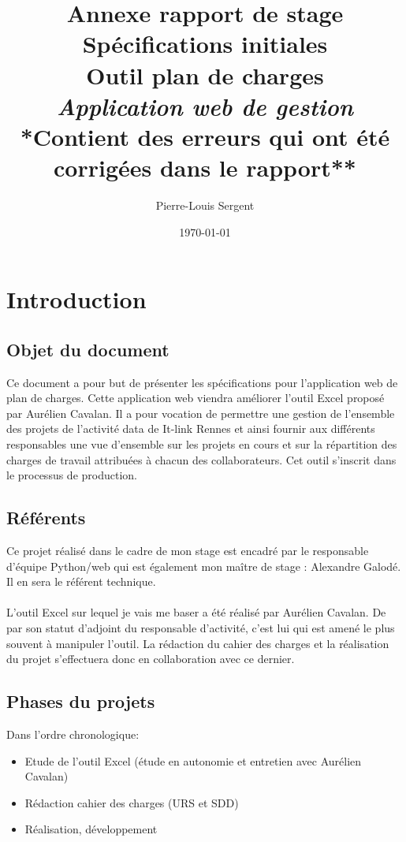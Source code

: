 \documentclass[french]{report}
\title{{\huge \textbf{Annexe rapport de stage}}\\
{\color{blue} \textbf{Spécifications initiales}}\\
Outil plan de charges\\
{\Large \textit{Application web de gestion}}\\
{\normalsize **Contient des erreurs qui ont été corrigées dans le rapport**}}
\date{\today}
\author{Pierre-Louis Sergent}
\begin{document}
    \maketitle

    \tableofcontents

\chapter{Introduction}
  \section{Objet du document}

Ce document a pour but de présenter les spécifications pour l’application web
de plan de charges. Cette application web viendra améliorer l’outil Excel
proposé par Aurélien Cavalan. Il a pour vocation de permettre une gestion de
l'ensemble des projets de l’activité data de It-link Rennes et ainsi fournir
aux différents responsables une vue d’ensemble sur les projets en cours et sur
la répartition des charges de travail attribuées à chacun des collaborateurs.
Cet outil s’inscrit dans le processus de production.

  \section{Référents}

Ce projet réalisé dans le cadre de mon stage est encadré par le responsable
d’équipe Python/web qui est également mon maître de stage : Alexandre Galodé. Il
en sera le référent technique.\\\\
L’outil Excel sur lequel je vais me baser a été réalisé par Aurélien Cavalan. De
par son statut d'adjoint du responsable d’activité, c’est lui qui est amené le
plus souvent à manipuler l’outil. La rédaction du cahier des charges et la
réalisation du projet s’effectuera donc en collaboration avec ce dernier.

  \section{Phases du projets}

Dans l'ordre chronologique:
\begin{itemize}[label=\textbullet, font=\normalfont \color{blue}]
  \item{Etude de l'outil Excel (étude en autonomie et entretien avec Aurélien Cavalan)}
  \item{Rédaction cahier des charges (URS et SDD)}
  \item{Réalisation, développement}
\end{itemize}
\end{document}
